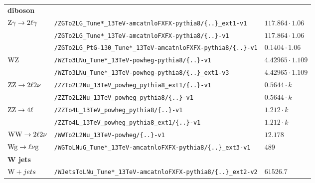 \begin{table}[tb]
\begin{tabular}[width=\textwidth]{lll}
  \scriptsize{\textbf{diboson}}                    &                         &                                           \\
  $\mathrm{Z}\gamma\to2\ell\gamma$                            & \verb|/ZGTo2LG_Tune*_13TeV-amcatnloFXFX-pythia8/{..}_ext1-v1| & $117.864\cdot1.06$                        \\
                                                   & \verb|/ZGTo2LG_Tune*_13TeV-amcatnloFXFX-pythia8/{..}-v1| & $117.864\cdot1.06$                        \\
                                                   & \verb|/ZGTo2LG_PtG-130_Tune*_13TeV-amcatnloFXFX-pythia8/{..}-v1| & $0.1404\cdot1.06$                         \\
  $\mathrm{W}\mathrm{Z}$                                         & \verb|/WZTo3LNu_Tune*_13TeV-powheg-pythia8/{..}-v1| & $4.42965\cdot1.109$                       \\
                                                   & \verb|/WZTo3LNu_Tune*_13TeV-powheg-pythia8/{..}_ext1-v3| & $4.42965\cdot1.109$                       \\
  $\mathrm{Z}\mathrm{Z}\to2\ell2\nu$                            & \verb|/ZZTo2L2Nu_13TeV_powheg_pythia8_ext1/{..}-v1| & $0.5644\cdot k$                           \\
                                                   & \verb|/ZZTo2L2Nu_13TeV_powheg_pythia8/{..}-v1| & $0.5644\cdot k$                           \\
  $\mathrm{Z}\mathrm{Z}\to4\ell$                                 & \verb|/ZZTo4L_13TeV_powheg_pythia8/{..}-v1| & $1.212\cdot k$                            \\
                                                   & \verb|/ZZTo4L_13TeV_powheg_pythia8_ext1/{..}-v1| & $1.212\cdot k$                            \\
  $\mathrm{W}\mathrm{W}\to2\ell2\nu$                            & \verb|/WWTo2L2Nu_13TeV-powheg/{..}-v1| & $12.178$                                  \\
  $\mathrm{W}\mathrm{g}\to\ell\nu\mathrm{g}$                           & \verb|/WGToLNuG_Tune*_13TeV-amcatnloFXFX-pythia8/{..}_ext3-v1| & $489$                                     \\
  \textbf{W jets}                                  &                         &                                           \\
  $\mathrm{W}+jets$                                       & \verb|/WJetsToLNu_Tune*_13TeV-amcatnloFXFX-pythia8/{..}_ext2-v2| & $61526.7$                                 \\

\end{tabular}
\end{table}
